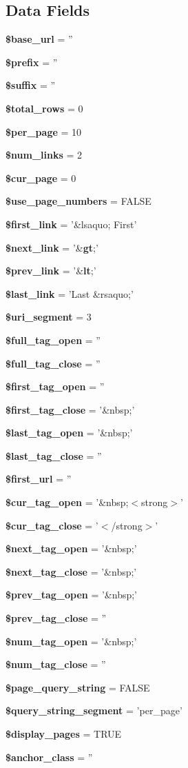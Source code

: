 \subsection*{Data Fields}
\begin{DoxyCompactItemize}
\item 
{\bf \$base\-\_\-url} = ''
\item 
{\bf \$prefix} = ''
\item 
{\bf \$suffix} = ''
\item 
{\bf \$total\-\_\-rows} = 0
\item 
{\bf \$per\-\_\-page} = 10
\item 
{\bf \$num\-\_\-links} = 2
\item 
{\bf \$cur\-\_\-page} = 0
\item 
{\bf \$use\-\_\-page\-\_\-numbers} = F\-A\-L\-S\-E
\item 
{\bf \$first\-\_\-link} = '\&lsaquo; First'
\item 
{\bf \$next\-\_\-link} = '\&{\bf gt};'
\item 
{\bf \$prev\-\_\-link} = '\&{\bf lt};'
\item 
{\bf \$last\-\_\-link} = 'Last \&rsaquo;'
\item 
{\bf \$uri\-\_\-segment} = 3
\item 
{\bf \$full\-\_\-tag\-\_\-open} = ''
\item 
{\bf \$full\-\_\-tag\-\_\-close} = ''
\item 
{\bf \$first\-\_\-tag\-\_\-open} = ''
\item 
{\bf \$first\-\_\-tag\-\_\-close} = '\&nbsp;'
\item 
{\bf \$last\-\_\-tag\-\_\-open} = '\&nbsp;'
\item 
{\bf \$last\-\_\-tag\-\_\-close} = ''
\item 
{\bf \$first\-\_\-url} = ''
\item 
{\bf \$cur\-\_\-tag\-\_\-open} = '\&nbsp;$<$strong$>$'
\item 
{\bf \$cur\-\_\-tag\-\_\-close} = '$<$/strong$>$'
\item 
{\bf \$next\-\_\-tag\-\_\-open} = '\&nbsp;'
\item 
{\bf \$next\-\_\-tag\-\_\-close} = '\&nbsp;'
\item 
{\bf \$prev\-\_\-tag\-\_\-open} = '\&nbsp;'
\item 
{\bf \$prev\-\_\-tag\-\_\-close} = ''
\item 
{\bf \$num\-\_\-tag\-\_\-open} = '\&nbsp;'
\item 
{\bf \$num\-\_\-tag\-\_\-close} = ''
\item 
{\bf \$page\-\_\-query\-\_\-string} = F\-A\-L\-S\-E
\item 
{\bf \$query\-\_\-string\-\_\-segment} = 'per\-\_\-page'
\item 
{\bf \$display\-\_\-pages} = T\-R\-U\-E
\item 
{\bf \$anchor\-\_\-class} = ''
\end{DoxyCompactItemize}


